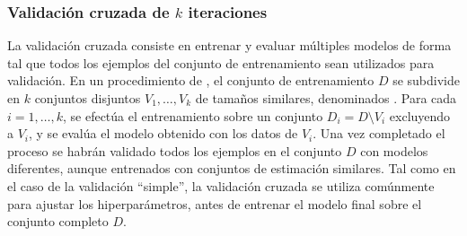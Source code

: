 %
\subsubsection{Validación cruzada de $k$ iteraciones}
%
La validación cruzada consiste en entrenar y evaluar 
múltiples modelos de forma tal que todos los ejemplos del conjunto de
entrenamiento sean utilizados para validación.
En un procedimiento de 
\cite{crossval}, el conjunto de entrenamiento $D$ se subdivide en $k$
conjuntos disjuntos $V_1,\ldots,V_k$ de tamaños similares, denominados
.
Para cada $i=1,\ldots,k$, se efectúa el entrenamiento sobre un
conjunto $D_i=D\setminus{}V_i$ excluyendo a $V_i$, y se evalúa el
modelo obtenido con los datos de $V_i$.
Una vez completado el proceso se habrán validado todos los ejemplos en
el conjunto $D$ con modelos diferentes, aunque entrenados con conjuntos
de estimación similares.
Tal como en el caso de la validación ``simple'', la validación cruzada
se utiliza comúnmente para ajustar los hiperparámetros, antes de
entrenar el modelo final sobre el conjunto completo $D$.
